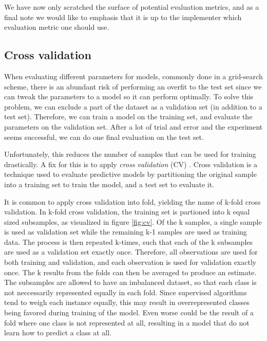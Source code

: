 We have now only scratched the surface of potential evaluation metrics, and as a final note we would like to emphasis that it is up to the implementer which evaluation metric one should use. %


\subsection{Cross validation}
\label{cross-validation}
When evaluating different parameters for models, commonly done in a grid-search scheme, there is an abundant risk of performing an overfit to the test set since we can tweak the parameters to a model so it can perform optimally. To solve this problem, we can exclude a part of the dataset as a validation set (in addition to a test set). Therefore, we can train a model on the training set, and evaluate the parameters on the validation set. After a lot of trial and error and the experiment seems successful, we can do one final evaluation on the test set.

Unfortunately, this reduces the number of samples that can be used for training drastically. A fix for this is to apply \textit{cross validation} (CV) \cite{Murphy2012}. Cross validation is a technique used to evaluate predictive models by partitioning the original sample into a training set to train the model, and a test set to evaluate it.


\noindent It is common to apply cross validation into fold, yielding the name of k-fold cross validation. In k-fold cross validation, the training set is partioned into k equal sized subsamples, as visualized in figure \ref{fig:cv}. Of the k samples, a single sample is used as validation set while the remaining k-1 samples are used as training data. The process is then repeated k-times, such that each of the k subsamples are used as a validation set exactly once. Therefore, all observations are used for both training and validation, and each observation is used for validation exactly once. The k results from the folds can then be averaged to produce an estimate. The subsamples are allowed to have an imbalanced dataset, so that each class is not neccessarily represented equally in each fold. Since supervised algorithms tend to weigh each instance equally, this may result in overrepresented classes being favored during training of the model. Even worse could be the result of a fold where one class is not represented at all, resulting in a model that do not learn how to predict a class at all.

